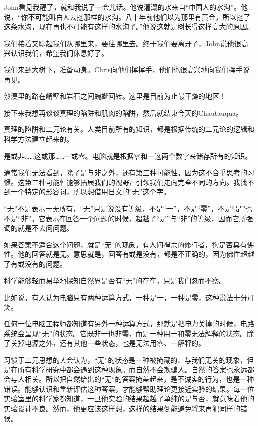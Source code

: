 \documentclass[UTF8]{article}
\begin{document}
\par John看见我醒了，就和我说了一会儿话。他说灌溉的水来自“中国人的水沟”。他说，“你不可能叫白人去挖那样的水沟。八十年前他们以为那里有黄金，所以挖了这条水沟，现在再也不可能有这样的水沟了。”他说这就是树长得这样高大的原因。
\par 我们接着又聊起我们从哪里来，要往哪里去。终于我们要离开了，John说他很高兴认识我们，希望我们休息好了。
\par 我们来到大树下，准备动身。Chris向他们挥挥手，他们也很高兴地向我们挥手说再见。
\par 沙漠里的路在峭壁和岩石之间蜿蜒回转。这里是目前为止最干燥的地区！
\par 接下来我想再谈谈真理的陷阱和肌肉的陷阱，然后就结束今天的Chautauqua。
\par 真理的陷阱和二元论有关。人类目前所有的知识，都是根据传统的二元论的逻辑和科学方法建立起来的。
\par 是或非……这或那……一或零。电脑就是根据零和一这两个数字来储存所有的知识。
\par 通常我们无法看到，除了是与非之外，还有第三种可能性，因为这不合乎思考的习惯。这第三种可能性能够拓展我们的视野，引领我们走向完全不同的方向。我找不到一个特定的形容词，所以想借用日文的“无”这个字。
\par “无”不是表示一无所有，“无”只是说没有等级，不是“一”，不是“零”，不是“是”也不是“非”。它表示在回答一个问题的时候，超越了“是”与“非”的等级，因而它所强调的就是不去问问题。
\par 如果答案不适合这个问题，就是“无”的现象。有人问禅宗的修行者，狗是否具有佛性。他的回答就是无。意思就是，回答有或是没有，都是不正确的，因为佛性超越了有或没有的问题。
\par 科学能够轻而易举地探知自然界是否有“无”的存在，只是我们忽而不察。
\par 比如说，有人认为电脑只有两种运算方式，一种是一，一种是零，这种说法十分可笑。
\par 任何一位电脑工程师都知道有另外一种运算方式，那就是把电力关掉的时候，电路系统会呈现“无”的状态。它既非一也非零，而是一种用一和零无法解释的状态。除了关掉电源之外，还有其他一些状态，也是无法用零、一解释的。
\par 习惯于二元思想的人会认为，“无”的状态是一种被掩藏的、与我们无关的现象，但是在所有科学研究中都会遇到这种现象。而自然不会欺骗人。自然的答案也永远都会与人相关。所以把自然给出的“无”的答案掩盖起来，是不诚实的行为，也是一种错误。能够认识和重新评估这种答案，才能够帮助理论更接近实验的结果。每一位实验室里的科学家都知道，一旦他实验的结果超越了单纯的是与否，就意味着他的实验设计不良。然而，他更应该这样想，这样的结果倒能避免将来再犯同样的错误。
\end{document}
